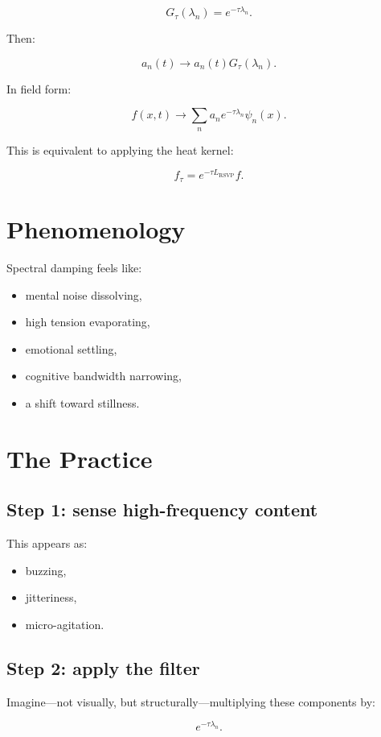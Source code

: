 \documentclass[12pt]{article}
\begin{document}
\[
G_\tau(\lambda_n) = e^{-\tau\lambda_n}.
\]

Then:

\[
a_n(t) \to a_n(t) G_\tau(\lambda_n).
\]

In field form:

\[
f(x,t) \to
\sum_n a_n e^{-\tau\lambda_n} \psi_n(x).
\]

This is equivalent to applying the heat kernel:

\[
f_\tau = e^{-\tau L_{\text{RSVP}}} f.
\]

\section{Phenomenology}

Spectral damping feels like:

\begin{itemize}
    \item mental noise dissolving,
    \item high tension evaporating,
    \item emotional settling,
    \item cognitive bandwidth narrowing,
    \item a shift toward stillness.
\end{itemize}

\section{The Practice}

\subsection*{Step 1: sense high-frequency content}

This appears as:

\begin{itemize}
    \item buzzing,
    \item jitteriness,
    \item micro-agitation.
\end{itemize}

\subsection*{Step 2: apply the filter}

Imagine—not visually, but structurally—multiplying these components by:

\[
e^{-\tau\lambda_n}.
\]
\end{document}
